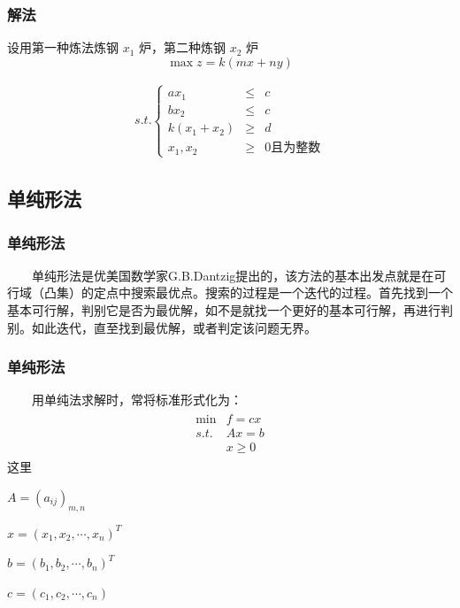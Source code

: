 \documentclass[slidestop,compress,mathserif,c]{beamer}
\begin{document}
\begin{frame}
\frametitle{解法}
设用第一种炼法炼钢 $x_1$ 炉，第二种炼钢 $x_2$ 炉
$$\max z=k(mx+ny)$$
\begin{center}
  \begin{eqnarray*}
    s.t.\left\{
      \begin{array}{ccc}
        ax_1&\leq&c\\
        bx_2&\leq&c\\
        k(x_1+x_2)&\geq&d\\
        x_1,x_2&\geq&0 \mbox{且为整数}
    \end{array}\right.
    \end{eqnarray*}
  \end{center}
\end{frame}


\subsection{\hfill 单纯形法}
\begin{frame}
\frametitle{单纯形法}
~~~~单纯形法是优美国数学家G.B.Dantzig提出的，该方法的基本出发点就是在可行域（凸集）的定点中搜索最优点。搜索的过程是一个迭代的过程。首先找到一个基本可行解，判别它是否为最优解，如不是就找一个更好的基本可行解，再进行判别。如此迭代，直至找到最优解，或者判定该问题无界。

\end{frame}


\begin{frame}
\frametitle{单纯形法}
~~~~用单纯法求解时，常将标准形式化为：
\begin{eqnarray*}
  \begin{array}{cc}
  \min & f=cx\\
  s.t.&
    Ax=b\\
    &x\geq0
  \end{array}
\end{eqnarray*}
这里
\begin{center}
$A=(a_{ij})_{m,n}$

$x=(x_1,x_2,\cdots,x_n)^T$

$b=(b_1,b_2,\cdots,b_n)^T$

$c=(c_1,c_2,\cdots,c_n)$
\end{center}
\end{frame}
\end{document}
